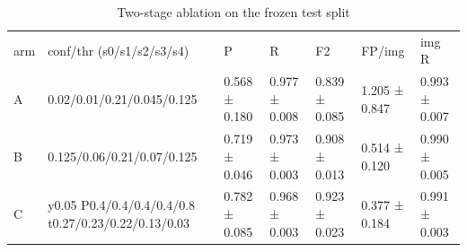 \begin{table}[t]\centering\small\caption{Two-stage ablation on the frozen test split}
\label{tab:t4twostage}
\begin{tabular}{|lllllll|}\hline
arm & conf/thr (s0/s1/s2/s3/s4) & P & R & F2 & FP/img & img R\\
A & 0.02/0.01/0.21/0.045/0.125 & 0.568 ± 0.180 & 0.977 ± 0.008 & 0.839 ± 0.085 & 1.205 ± 0.847 & 0.993 ± 0.007\\
B & 0.125/0.06/0.21/0.07/0.125 & 0.719 ± 0.046 & 0.973 ± 0.003 & 0.908 ± 0.013 & 0.514 ± 0.120 & 0.990 ± 0.005\\
C & y0.05 P0.4/0.4/0.4/0.4/0.8 t0.27/0.23/0.22/0.13/0.03 & 0.782 ± 0.085 & 0.968 ± 0.003 & 0.923 ± 0.023 & 0.377 ± 0.184 & 0.991 ± 0.003\\
\hline\end{tabular}\end{table}
